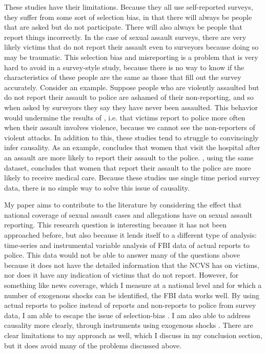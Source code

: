 \documentclass[AER,draftmode]{AEA}
\begin{document}
These studies have their limitations. Because they all use self-reported surveys, they suffer from some sort of selection bias, in that there will always be people that are asked but do not participate. There will also always be people that report things incorrectly. In the case of sexual assault surveys, there are very likely victims that do not report their assault even to surveyors because doing so may be traumatic. This selection bias and misreporting is a problem that is very hard to avoid in a survey-style study, because there is no way to know if the characteristics of these people are the same as those that fill out the survey accurately. Consider an example. Suppose people who are violently assaulted but do not report their assault to police are ashamed of their non-reporting, and so when asked by surveyors they say they have never been assaulted. This behavior would undermine the results of , i.e. that victims report to police more often when their assault involves violence, because we cannot see the non-reporters of violent attacks. In addition to this, these studies tend to struggle to convincingly infer causality. As an example,  concludes that women that visit the hospital after an assault are more likely to report their assault to the police. , using the same dataset, concludes that women that report their assault to the police are more likely to receive medical care. Because these studies use single time period survey data, there is no simple way to solve this issue of causality.

My paper aims to contribute to the literature by considering the effect that national coverage of sexual assault cases and allegations have on sexual assault reporting. This research question is interesting because it has not been approached before, but also because it lends itself to a different type of analysis: time-series and instrumental variable analysis of FBI data of actual reports to police. This data would not be able to answer many of the questions above because it does not have the detailed information that the NCVS has on victims, nor does it have any indication of victims that do not report. However, for something like news coverage, which I measure at a national level and for which a number of exogenous shocks can be identified, the FBI data works well. By using actual reports to police instead of reports and non-reports to police from survey data, I am able to escape the issue of selection-bias . I am also able to address causality more clearly, through instruments using exogenous shocks . There are clear limitations to my approach as well, which I discuss in my conclusion section, but it does avoid many of the problems discussed above.
\end{document}
